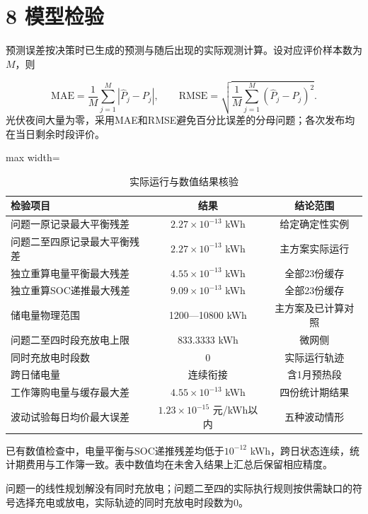 \documentclass[UTF8,a4paper,zihao=-4,fontset=windows]{ctexart}
\begin{document}
\section{8 模型检验}
预测误差按决策时已生成的预测与随后出现的实际观测计算。设对应评价样本数为$M$，则
\par
\begin{equation}
\mathrm{MAE}=\frac1M\sum_{j=1}^M|\widehat P_j-P_j|,\qquad
\mathrm{RMSE}=\sqrt{\frac1M\sum_{j=1}^M(\widehat P_j-P_j)^2}. \tag{20}
\end{equation}
光伏夜间大量为零，采用MAE和RMSE避免百分比误差的分母问题；各次发布均在当日剩余时段评价。
\par
\begin{table}[H]\centering
\fontsize{9.5}{12}\selectfont\setlength{\tabcolsep}{4pt}\renewcommand{\arraystretch}{1.12}
\begin{adjustbox}{max width=\linewidth}\begin{tabular}{lcc}\toprule
\textbf{检验项目} & \textbf{结果} & \textbf{结论范围}\\\midrule
问题一原记录最大平衡残差 & $2.27\times10^{-13}$ kWh & 给定确定性实例\\
问题二至四原记录最大平衡残差 & $2.27\times10^{-13}$ kWh & 主方案实际运行\\
独立重算电量平衡最大残差 & $4.55\times10^{-13}$ kWh & 全部23份缓存\\
独立重算SOC递推最大残差 & $9.09\times10^{-13}$ kWh & 全部23份缓存\\
储电量物理范围 & 1200—10800 kWh & 主方案及已计算对照\\
问题二至四时段充放电上限 & 833.3333 kWh & 微网侧\\
同时充放电时段数 & 0 & 实际运行轨迹\\
跨日储电量 & 连续衔接 & 含1月预热段\\
工作簿购电量与缓存最大差 & $4.55\times10^{-13}$ kWh & 四份统计期结果\\
波动试验每日均价最大误差 & $1.23\times10^{-15}$ 元/kWh以内 & 五种波动情形\\
\bottomrule\end{tabular}\end{adjustbox}
\caption{实际运行与数值结果核验}
\end{table}
已有数值检查中，电量平衡与SOC递推残差均低于$10^{-12}$ kWh，跨日状态连续，统计期费用与工作簿一致。表中数值均在未舍入结果上汇总后保留相应精度。
\par
问题一的线性规划解没有同时充放电；问题二至四的实际执行规则按供需缺口的符号选择充电或放电，实际轨迹的同时充放电时段数为0。
\par
\end{document}
